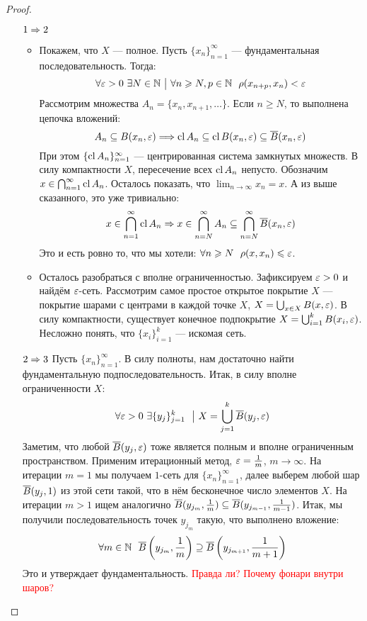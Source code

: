\begin{proof}~
	\begin{enumerate}
		\item[$1 \Rightarrow 2$] 
		\begin{itemize}
			\item Покажем, что $X$ --- полное. Пусть $\{x_n\}_{n = 1}^\infty$ --- фундаментальная последовательность. Тогда:
			\[
				\forall \varepsilon > 0\ \exists N \in \mathbb{N} \ \big|\  \forall n \geqslant N, p \in \mathbb{N}\ \ \rho(x_{n + p}, x_n) < \varepsilon
			\]
			Рассмотрим множества $A_n = \{x_n, x_{n + 1}, \ldots\}$. Если $n \ge N$, то выполнена цепочка вложений:
			\[
				A_n \subseteq B(x_n, \varepsilon) \Longrightarrow \operatorname{cl} A_n \subseteq \operatorname{cl} B(x_n, \varepsilon) \subseteq \overline{B}(x_n, \varepsilon)
			\]
			При этом $\{\operatorname{cl} A_n\}_{n = 1}^\infty$ --- центрированная система замкнутых множеств. В силу компактности $X$, пересечение всех $\operatorname{cl} A_n$ непусто. Обозначим $x \in \bigcap_{n = 1}^\infty \operatorname{cl} A_n$. Осталось показать, что $\lim_{n \to \infty} x_n = x$. А из выше сказанного, это уже тривиально:
			\[
				x \in \bigcap_{n = 1}^\infty \operatorname{cl} A_n \Rightarrow x \in \bigcap_{n = N}^\infty A_n \subseteq \bigcap_{n = N}^\infty \overline{B}(x_n, \varepsilon)
			\]
			Это и есть ровно то, что мы хотели: $\forall n \ge N\ \ \rho(x, x_n) \le \eps$.
			
			\item Осталось разобраться с вполне ограниченностью. Зафиксируем $\varepsilon > 0$ и найдём $\varepsilon$-сеть. Рассмотрим самое простое открытое покрытие $X$ --- покрытие шарами с центрами в каждой точке $X$, $X = \bigcup_{x \in X} B(x, \varepsilon)$. В силу компактности, существует конечное подпокрытие $X = \bigcup_{i = 1}^k B(x_i, \varepsilon)$. Несложно понять, что $\{x_i\}_{i = 1}^k$ --- искомая сеть.
		\end{itemize}
	
		\item[$2 \Rightarrow 3$] Пусть $\{x_n\}_{n = 1}^\infty$. В силу полноты, нам достаточно найти фундаментальную подпоследовательность.  Итак, в силу вполне ограниченности $X$:
		\[
			\forall \varepsilon > 0\ \exists \{y_j\}_{j = 1}^k\ \ \big|\  X = \bigcup_{j = 1}^k \overline{B}(y_j, \varepsilon)
		\]
		Заметим, что любой $\overline{B}(y_j, \varepsilon)$ тоже является полным и вполне ограниченным пространством. Применим итерационный метод, $\varepsilon = \frac{1}{m}$, $m \to \infty$. На итерации $m = 1$ мы получаем $1$-сеть для $\{x_n\}_{n = 1}^\infty$, далее выберем любой шар $\overline{B}(y_j, 1)$ из этой сети такой, что в нём бесконечное число элементов $X$. На итерации $m > 1$ ищем аналогично $\overline{B}(y_{j_m}, \frac{1}{m}) \subseteq \overline{B}(y_{j_{m - 1}}, \frac{1}{m - 1})$.  Итак, мы получили последовательность точек $y_{j_m}$ такую, что выполнено вложение:
		\[
			\forall m \in \mathbb{N}\ \ \overline{B}\left(y_{j_m}, \frac{1}{m}\right) \supseteq \overline{B}\left(y_{j_{m + 1}}, \frac{1}{m + 1}\right)
		\]
		Это и утверждает фундаментальность. \textcolor{red}{Правда ли? Почему фонари внутри шаров?}
		

\end{enumerate}
\end{proof}
